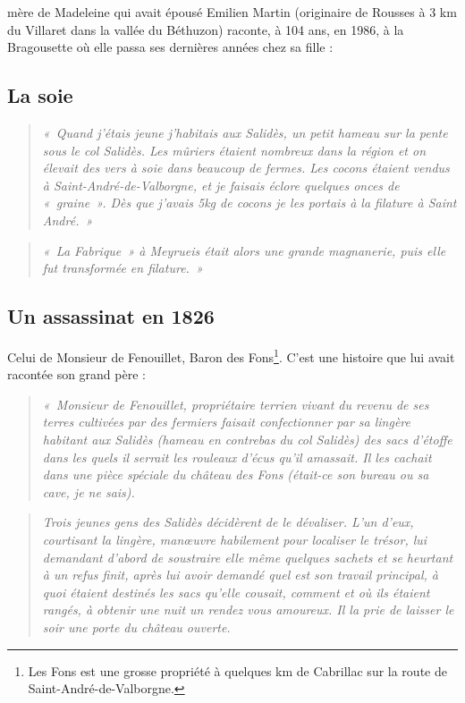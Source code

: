 




 mère de Madeleine qui avait épousé Emilien Martin (originaire de Rousses à 3 km du Villaret dans la vallée du Béthuzon) raconte, à 104 ans, en 1986, à la Bragousette où elle passa ses dernières années chez sa fille :

\subsection{La soie}

\begin{quote}
\textit{«~Quand j’étais jeune j’habitais aux Salidès, un petit hameau sur la pente sous le col Salidès.
Les mûriers étaient nombreux dans la région et on élevait des vers à soie dans beaucoup de
fermes. Les cocons étaient vendus à Saint-André-de-Valborgne, et je faisais éclore quelques
onces de «~graine~». Dès que j’avais 5kg de cocons je les portais à la filature à Saint André.~»}
\end{quote}

\begin{quote}
\textit{«~La Fabrique~» à Meyrueis était alors une grande magnanerie, puis elle fut transformée en
filature.~»}
\end{quote}

\subsection{Un assassinat en 1826}

Celui de Monsieur de Fenouillet, Baron des Fons\footnote{Les Fons est une grosse propriété à
quelques km de Cabrillac sur la route de Saint-André-de-Valborgne.}. C’est une histoire que
lui avait racontée son grand père :

\begin{quote}
\textit{«~Monsieur de Fenouillet, propriétaire terrien vivant du revenu de ses terres cultivées par
des fermiers faisait confectionner par sa lingère habitant aux Salidès (hameau en contrebas
du col Salidès) des sacs d’étoffe dans les quels il serrait les rouleaux d’écus qu’il amassait. Il
les cachait dans une pièce spéciale du château des Fons (était-ce son bureau ou sa cave, je ne
sais).}
\end{quote}

\begin{quote}
\textit{Trois jeunes gens des Salidès décidèrent de le dévaliser. L’un d’eux, courtisant la lingère,
manœuvre habilement pour localiser le trésor, lui demandant d’abord de soustraire elle
même quelques sachets et se heurtant à un refus finit, après lui avoir demandé quel est son
travail principal, à quoi étaient destinés les sacs qu’elle cousait, comment et où ils étaient
rangés, à obtenir une nuit un rendez vous amoureux. Il la prie de laisser le soir une porte du
château ouverte.}
\end{quote}

